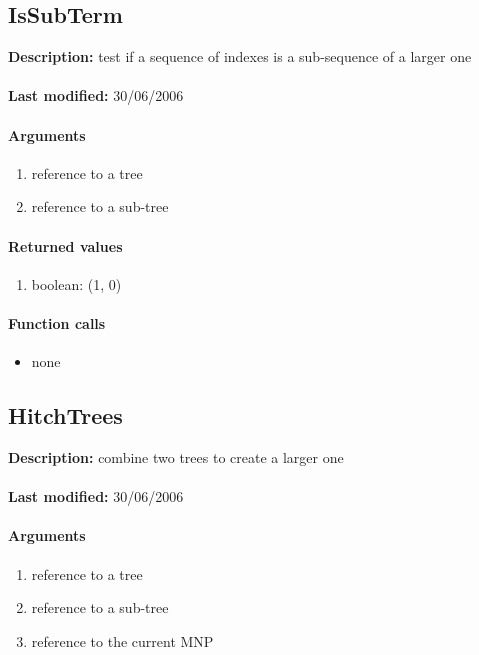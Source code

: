 \subsection{IsSubTerm}
\textbf{Description:} test if a sequence of indexes is a sub-sequence of a larger one\\
\\\textbf{Last modified:} 30/06/2006

\paragraph{Arguments}
\begin{enumerate}
\item reference to a tree
\item reference to a sub-tree
\end{enumerate}

\paragraph{Returned values}
\begin{enumerate}
\item boolean: (1, 0)
\end{enumerate}

\paragraph{Function calls}
\begin{itemize}
\item none
\end{itemize}

\subsection{HitchTrees}
\textbf{Description:} combine two trees to create a larger one\\
\\\textbf{Last modified:} 30/06/2006

\paragraph{Arguments}
\begin{enumerate}
\item reference to a tree
\item reference to a sub-tree
\item reference to the current MNP
\end{enumerate}

